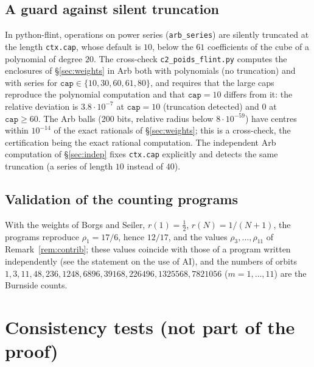 \documentclass[11pt,a4paper]{article}
\theoremstyle{plain}
\theoremstyle{remark}
\numberwithin{equation}{section}
\begin{document}
\subsection{A guard against silent truncation}\label{sec:guard}
In python-flint, operations on power series (\texttt{arb\_series}) are silently truncated at the length \texttt{ctx.cap}, whose
default is $10$, below the $61$ coefficients of the cube of a polynomial of degree $20$. The cross-check \texttt{c2\_poids\_flint.py}
computes the enclosures of \S\ref{sec:weights} in Arb both with polynomials (no truncation) and with series for
$\texttt{cap}\in\{10,30,60,61,80\}$, and requires that the large caps reproduce the polynomial computation and that $\texttt{cap}=10$
differs from it: the relative deviation is $3.8\cdot10^{-7}$ at $\texttt{cap}=10$ (truncation detected) and $0$ at
$\texttt{cap}\ge60$. The Arb balls (200 bits, relative radius below $8\cdot10^{-59}$) have centres within $10^{-14}$ of the exact
rationals of \S\ref{sec:weights}; this is a cross-check, the certification being the exact rational computation. The independent Arb
computation of \S\ref{sec:indep} fixes \texttt{ctx.cap} explicitly and detects the same truncation (a series of length $10$ instead of
$40$).

\subsection{Validation of the counting programs}
With the weights of Borgs and Seiler, $r(1)=\frac12$, $r(N)=1/(N+1)$, the programs reproduce $\rho_1=17/6$, hence $12/17$, and the
values $\rho_3,\dots,\rho_{11}$ of Remark~\ref{rem:contrib}; these values coincide with those of a program written independently
(see the statement on the use of AI), and the numbers of orbits $1,3,11,48,236,1248,6896,39168,226496,1325568,7821056$ ($m=1,\dots,11$) are the Burnside
counts.

\section{Consistency tests (not part of the proof)}\label{sec:checks}
\end{document}
